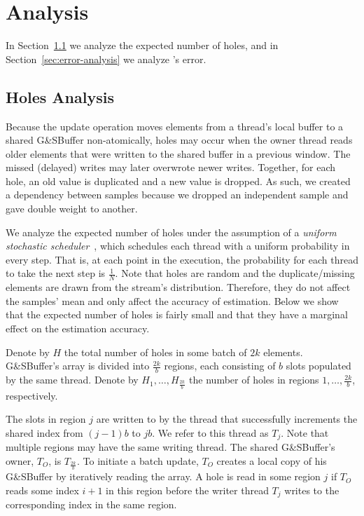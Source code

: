 \chapter{Analysis}
\label{chap:analysis}

In Section~\ref{sec:holes-analysis} we analyze the expected number of holes, and in Section~\ref{sec:error-analysis} we analyze \mysketch's error.

\section{Holes Analysis}
\label{sec:holes-analysis}

Because the update operation moves elements from a thread's local buffer to a shared G\&SBuffer non-atomically, holes may occur when the owner thread reads older elements that were written to the shared buffer in a previous window. The missed (delayed) writes may later overwrote newer writes. Together, for each hole, an old value is duplicated and a new value is dropped. As such, we created a dependency between samples because we dropped an independent sample and gave double weight to another. 

We analyze the expected number of holes under the assumption of a \emph{uniform stochastic scheduler}~\cite{alistarh2016lock}, which schedules each thread with a uniform probability in every step. That is, at each point in the execution, the probability for each thread to take the next step is $\frac{1}{N}$. Note that holes are random and the duplicate/missing elements are drawn from the stream's distribution. Therefore, they do not affect the samples' mean and only affect the accuracy of estimation. Below we show that the expected number of holes is fairly small and that they have a marginal effect on the estimation accuracy. 

Denote by $H$ the total number of holes in some batch of $2k$ elements. G\&SBuffer's array is divided into $\frac{2k}{b}$ regions, each consisting of $b$ slots populated by the same thread. Denote by $H_1,\dots, H_{\frac{2k}{b}}$ the number of holes in regions $1, \dots, \frac{2k}{b}$, respectively.

The slots in region $j$ are written to by the thread that successfully increments the shared index from $(j-1)b$ to $jb$. We refer to this thread as $T_j$. Note that multiple regions may have the same writing thread. The shared G\&SBuffer's owner, $T_O$, is $T_{\frac{2k}{b}}$. To initiate a batch update, $T_O$ creates a local copy of his G\&SBuffer by iteratively reading the array. A hole is read in some region $j$ if $T_O$ reads some index $i+1$ in this region before the writer thread $T_j$ writes to the corresponding index in the same region.

